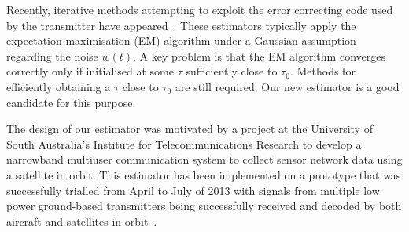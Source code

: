 \documentclass[journal]{IEEEtranTCOM}
\begin{document}
Recently, iterative methods attempting to exploit the error correcting code used by the transmitter have appeared~\cite{Herzet_turbo_synch_proc_IEEE_2007,Herzet_timingturbosynch_2007,Herzet_framework_turbo_sync_2007}.  %
These estimators typically apply the expectation maximisation (EM) algorithm under a Gaussian assumption regarding the noise $w(t)$.  A key problem is that the EM algorithm converges correctly only if initialised at some $\tau$ sufficiently close to $\tau_0$.  Methods for efficiently obtaining a $\tau$ close to $\tau_0$ are still required.  Our new estimator is a good candidate for this purpose.  %

The design of our estimator was motivated by a project at the University of South Australia's Institute for Telecommunications Research to develop a narrowband multiuser communication system to collect sensor network data using a satellite in orbit.  This estimator has been implemented on a prototype that was successfully trialled from April to July of 2013 with signals from multiple low power ground-based transmitters being successfully received and decoded by both aircraft and satellites in orbit~\cite{ASRPpromovideo}.
\end{document}
